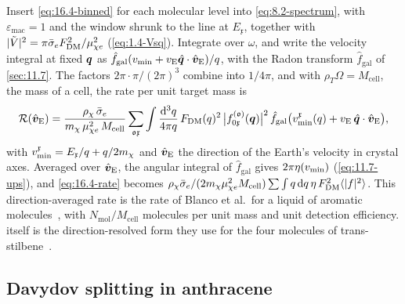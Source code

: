 Insert \cref{eq:16.4-binned} for each molecular level into \cref{eq:8.2-spectrum}, with $\varepsilon_{\mathrm{mac}} = 1$ and the window shrunk to the line at $E_{\mathfrak{x}}$, together with $|\tilde V|^2 = \pi\bar{\sigma}_{e}F_{\mathrm{DM}}^2/\mu_{\chi e}^2$ (\cref{eq:1.4-Vsq}). Integrate over $\omega$, and write the velocity integral at fixed $\bm{q}$ as $\hat f_{\mathrm{gal}}(v_{\mathrm{min}} + v_{\mathrm{E}}\hat{\bm{q}}\cdot\hat{\bm{v}}_{\mathrm{E}})/q$, with the Radon transform $\hat f_{\mathrm{gal}}$ of \cref{sec:11.7}. The factors $2\pi\cdot\pi/(2\pi)^3$ combine into $1/4\pi$, and with $\rho_T\Omega = M_{\mathrm{cell}}$, the mass of a cell, the rate per unit target mass is
\begin{equation}
  \mathcal{R}(\hat{\bm{v}}_{\mathrm{E}}) = \frac{\rho_\chi\,\bar{\sigma}_{e}}{m_{\chi}\,\mu_{\chi e}^2\,M_{\mathrm{cell}}}\sum_{\mathfrak{o}\mathfrak{x}}\int\frac{\mathrm{d}^3q}{4\pi q}\,F_{\mathrm{DM}}(q)^2\,\bigl|f^{(\mathfrak{o})}_{0\mathfrak{x}}(\bm{q})\bigr|^2\,\hat f_{\mathrm{gal}}\bigl(v_{\mathrm{min}}^{\mathfrak{x}}(q) + v_{\mathrm{E}}\,\hat{\bm{q}}\cdot\hat{\bm{v}}_{\mathrm{E}}\bigr) ,
  \label{eq:16.4-rate}
\end{equation}
with $v_{\mathrm{min}}^{\mathfrak{x}} = E_{\mathfrak{x}}/q + q/2m_{\chi}$ and $\hat{\bm{v}}_{\mathrm{E}}$ the direction of the Earth's velocity in crystal axes. Averaged over $\hat{\bm{v}}_{\mathrm{E}}$, the angular integral of $\hat f_{\mathrm{gal}}$ gives $2\pi\eta(v_{\mathrm{min}})$ (\cref{eq:11.7-ups}), and \cref{eq:16.4-rate} becomes $\rho_\chi\bar{\sigma}_{e}/(2m_{\chi}\mu_{\chi e}^2M_{\mathrm{cell}})\sum\int q\,\mathrm{d} q\,\eta\,F_{\mathrm{DM}}^2\langle|f|^2\rangle$. This direction-averaged rate is the rate of Blanco et al.\ for a liquid of aromatic molecules~\cite[Eqs.~(11), (13), (16)--(19)]{blanco2020dark}, with $N_{\mathrm{mol}}/M_{\mathrm{cell}}$ molecules per unit mass and unit detection efficiency.  itself is the direction-resolved form they use for the four molecules of trans-stilbene~\cite[Eqs.~(8), (9)]{blanco2021dark}.

\subsection{Davydov splitting in anthracene}\label{sec:16.4-model}

